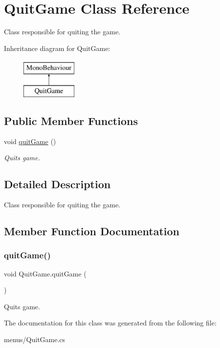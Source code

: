 \hypertarget{class_quit_game}{}\section{Quit\+Game Class Reference}
\label{class_quit_game}


Class responsible for quiting the game.  


Inheritance diagram for Quit\+Game\+:\begin{figure}[H]
\begin{center}
\leavevmode
\includegraphics[height=2.000000cm]{class_quit_game}
\end{center}
\end{figure}
\subsection*{Public Member Functions}
\begin{DoxyCompactItemize}
\item 
void \mbox{\hyperlink{class_quit_game_ab91abbfccb620b7f99b0c661756d45e6}{quit\+Game}} ()
\begin{DoxyCompactList}\small\item\em Quits game. \end{DoxyCompactList}\end{DoxyCompactItemize}


\subsection{Detailed Description}
Class responsible for quiting the game. 



\subsection{Member Function Documentation}
\mbox{\label{class_quit_game_ab91abbfccb620b7f99b0c661756d45e6}} 
\subsubsection{\texorpdfstring{quit\+Game()}{quitGame()}}
{\footnotesize\ttfamily void Quit\+Game.\+quit\+Game (\begin{DoxyParamCaption}{ }\end{DoxyParamCaption})}



Quits game. 



The documentation for this class was generated from the following file\+:\begin{DoxyCompactItemize}
\item 
menus/Quit\+Game.\+cs\end{DoxyCompactItemize}
